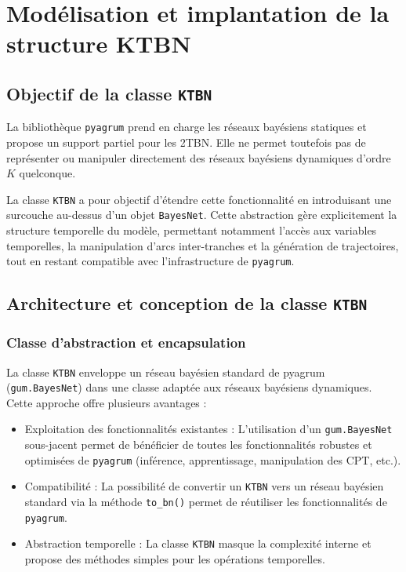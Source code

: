 \documentclass{article}
\begin{document}
\section{Modélisation et implantation de la structure KTBN}

\subsection{Objectif de la classe \texttt{KTBN}}

La bibliothèque \texttt{pyagrum} prend en charge les réseaux bayésiens statiques et propose un support partiel
pour les 2TBN. Elle ne permet toutefois pas de représenter ou manipuler directement des réseaux bayésiens
dynamiques d'ordre $K$ quelconque.

La classe \texttt{KTBN} a pour objectif d'étendre cette fonctionnalité en introduisant une surcouche au-dessus
d'un objet \texttt{BayesNet}. Cette abstraction gère explicitement la structure temporelle du modèle, permettant
notamment l'accès aux variables temporelles, la manipulation d'arcs inter-tranches et la génération de trajectoires,
tout en restant compatible avec l'infrastructure de \texttt{pyagrum}.


\subsection{Architecture et conception de la classe \texttt{KTBN}}

\subsubsection{Classe d'abstraction et encapsulation}

La classe \texttt{KTBN} enveloppe un réseau bayésien standard de pyagrum (\texttt{gum.BayesNet}) dans une classe
adaptée aux réseaux bayésiens dynamiques. Cette approche offre plusieurs avantages :

\begin{itemize}
    \item Exploitation des fonctionnalités existantes :  L'utilisation d'un \texttt{gum.BayesNet} sous-jacent
          permet de bénéficier de toutes les fonctionnalités robustes et optimisées de \texttt{pyagrum} (inférence,
          apprentissage, manipulation des CPT, etc.).
    \item Compatibilité : La possibilité de convertir un \texttt{KTBN} vers un réseau bayésien standard via
          la méthode \texttt{to\_bn()} permet de réutiliser les fonctionnalités de \texttt{pyagrum}.
    \item Abstraction temporelle : La classe \texttt{KTBN} masque la complexité interne et propose des méthodes
          simples pour les opérations temporelles.
\end{itemize}
\end{document}
